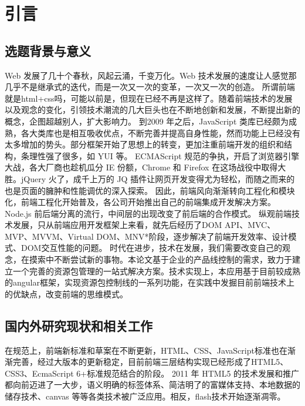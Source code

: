 
\chapter{引言}
\label{cha:introduction}
\section{选题背景与意义}
\label{sec:background}
Web 发展了几十个春秋，风起云涌，千变万化。Web 技术发展的速度让人感觉那几乎不是继承式的迭代，而是一次又一次的变革，一次又一次的创造。
所谓前端就是html+css吗，可能以前是，但现在已经不再是这样了。随着前端技术的发展以及观念的变化，引领技术潮流的几大巨头也在不断地创新和发展，不断提出新的概念，企图超越别人，扩大影响力。
到2009 年之后，JavaScript 类库已经颇为成熟，各大类库也是相互吸收优点，不断完善并提高自身性能，然而功能上已经没有太多增加的势头。部分框架开始了思想上的转变，更加注重前端开发的组织和结构，条理性强了很多，如 YUI 等。
ECMAScript 规范的争执，开启了浏览器引擎大战，各大厂商也趁机瓜分 IE 份额，Chrome 和 Firefox 在这场战役中取得大胜。jQuery 火了，成千上万的 JQ 插件让网页开发变得尤为轻松，而随之而来的也是页面的臃肿和性能调优的深入探索。
因此，前端风向渐渐转向工程化和模块化，前端工程化开始普及，各公司开始推出自己的前端集成开发解决方案。Node.js 前后端分离的流行，中间层的出现改变了前后端的合作模式。
纵观前端技术发展，只从前端应用开发框架上来看，就先后经历了DOM API、MVC、MVP、MVVM、Virtual DOM、MNV*阶段，逐步解决了前端开发效率、设计模式、DOM交互性能的问题。
时代在进步，技术在发展，我们需要改变自己的观念，在摸索中不断尝试新的事物。本论文基于企业的产品线控制的需求，致力于建立一个完善的资源包管理的一站式解决方案。技术实现上，本应用基于目前较成熟的angular框架，实现资源包控制线的一系列功能，在实践中发掘目前前端技术上的优缺点，改变前端的思维模式。

\section{国内外研究现状和相关工作}
\label{sec:related_work}
在规范上，前端新标准和草案在不断更新，HTML、CSS、JavaScript标准也在渐渐完善，经过大版本的更新稳定，目前前端三层结构实现已经形成了HTML5、CSS3、EcmaScript 6+标准规范结合的阶段。
2011 年 HTML5 的技术发展和推广都向前迈进了一大步，语义明确的标签体系、简洁明了的富媒体支持、本地数据的储存技术、canvas 等等各类技术被广泛应用。相反，flash技术开始逐渐凋零。

